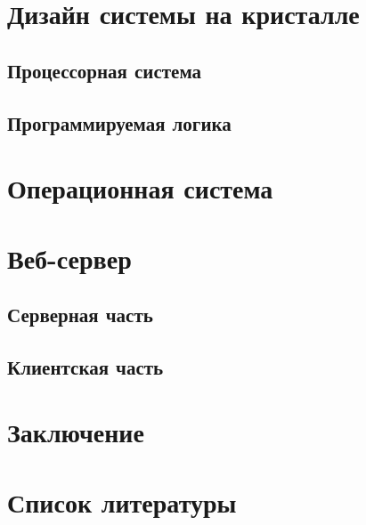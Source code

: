 \documentclass[a4paper, 14pt]{extarticle}
\begin{document}
\section{Дизайн системы на кристалле}
    
    \subsection{Процессорная система}
    
    \subsection{Программируемая логика}
    
    \newpage

\section{Операционная система}
    
    \newpage

\section{Веб-сервер}
    \subsection{Серверная часть}
    
    \subsection{Клиентская часть}
    
    \newpage

\section*{Заключение}
\newpage

\section*{Список литературы}
\end{document}
